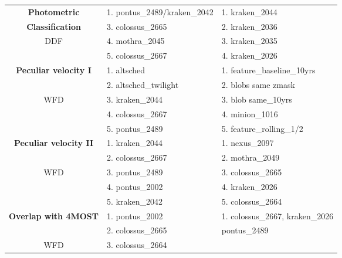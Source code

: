 \begin{longtable}{c|l|l}
{\bf Photometric}              & 1. pontus\_2489/kraken\_2042             &  1. kraken\_2044 \\
{\bf Classification}           & 3. colossus\_2665                        &  2. kraken\_2036\\
      DDF                      & 4. mothra\_2045                          &  3. kraken\_2035\\
                               & 5. colossus\_2667                        &  4. kraken\_2026\\
\hline
{\bf Peculiar velocity I}      & 1. altsched                              &  1. feature\_baseline\_10yrs \\
                               & 2. altsched\_twilight                     &  2. blobs same zmask\\
      WFD                      & 3. kraken\_2044                           &  3. blob same\_10yrs \\
                               & 4. colossus\_2667                        &  4. minion\_1016\\
                               & 5. pontus\_2489                          &  5. feature\_rolling\_1/2\\
\hline
     
{\bf Peculiar velocity II}     & 1. kraken\_2044                          &  1. nexus\_2097\\
                               & 2. colossus\_2667                        &  2. mothra\_2049 \\
      WFD                      & 3. pontus\_2489                          &  3. colossus\_2665 \\
                               & 4. pontus\_2002                          &  4. kraken\_2026 \\
                               & 5. kraken\_2042                           &  5. colossus\_2664 \\
      \hline

 {\bf Overlap with 4MOST}      & 1. pontus\_2002                          &  1. colossus\_2667, kraken\_2026\\
                               & 2. colossus\_2665                        &  pontus\_2489\\
   WFD                         & 3. colossus\_2664                        &   \\
     \hline
\end{longtable}

